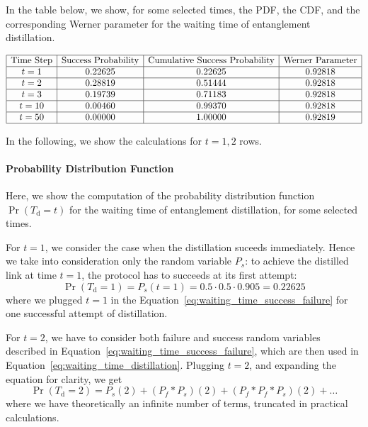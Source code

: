 \documentclass{masterthesis}
\begin{document}
In the table below, we show, for some selected times, the PDF, the CDF, and the corresponding Werner parameter for the waiting time of entanglement distillation.

\begin{equation*}
    \begin{array}{|c|c|c|c|}
        \hline
        \text{Time Step} & \text{Success Probability} & \text{Cumulative Success Probability} & \text{Werner Parameter} \\
        \hline
        t = 1 & 0.22625 & 0.22625 & 0.92818 \\
        \hline
        t = 2 & 0.28819 & 0.51444 & 0.92818 \\
        \hline
        t = 3 & 0.19739 & 0.71183 & 0.92818 \\
        \hline
        t = 10 & 0.00460 & 0.99370 & 0.92818 \\
        \hline
        t = 50 & 0.00000 & 1.00000 & 0.92819 \\
        \hline
    \end{array}
\end{equation*}

In the following, we show the calculations for $t={1,2}$ rows.

\paragraph*{Probability Distribution Function}

Here, we show the computation of the probability distribution function $\Pr(T_{\text{d}} = t)$ for the waiting time of entanglement distillation, for some selected times.

For $t = 1$, we consider the case when the distillation suceeds immediately. Hence we take into consideration only the random variable $P_s$: to achieve the distilled link at time $t=1$, the protocol has to succeeds at its first attempt: 
\begin{equation}
    \Pr(T_{\text{d}} = 1) = P_s(t = 1) = 0.5 \cdot 0.5 \cdot 0.905 = 0.22625
\end{equation}
where we plugged $t = 1$ in the Equation~\ref{eq:waiting_time_success_failure} for one successful attempt of distillation.

For $t = 2$, we have to consider both failure and success random variables described in Equation~\ref{eq:waiting_time_success_failure}, which are then used in Equation~\ref{eq:waiting_time_distillation}. Plugging $t=2$, and expanding the equation for clarity, we get 
\begin{equation}\label{eq:distillation_t2}
    \Pr(T_{\text{d}} = 2) = P_s(2) + (P_f \ast P_s)(2) + (P_f \ast P_f \ast P_s)(2) + \ldots
\end{equation}
where we have theoretically an infinite number of terms, truncated in practical calculations.
\end{document}
